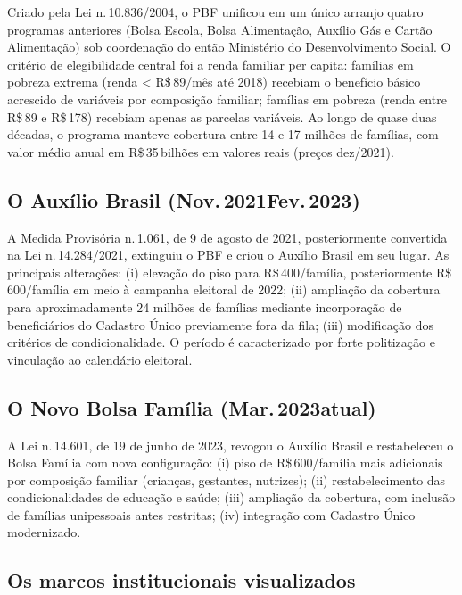 \documentclass[12pt,a4paper,oneside]{article}
\newcommand{\rs}{R\$\,}
\begin{document}
Criado pela Lei n.\,10.836/2004, o PBF unificou em um único arranjo
quatro programas anteriores (Bolsa Escola, Bolsa Alimentação,
Auxílio Gás e Cartão Alimentação) sob coordenação do então
Ministério do Desenvolvimento Social. O critério de elegibilidade
central foi a renda familiar per capita: famílias em pobreza
extrema (renda < \rs 89/mês até 2018) recebiam o benefício básico
acrescido de variáveis por composição familiar; famílias em pobreza
(renda entre \rs 89 e \rs 178) recebiam apenas as parcelas
variáveis. Ao longo de quase duas décadas, o programa manteve
cobertura entre 14 e 17 milhões de famílias, com valor médio anual
em \rs 35\,bilhões em valores reais (preços
dez/2021).

\subsection{O Auxílio Brasil (Nov.\,2021\textendash Fev.\,2023)}

A Medida Provisória n.\,1.061, de 9 de agosto de 2021,
posteriormente convertida na Lei n.\,14.284/2021, extinguiu o PBF e
criou o Auxílio Brasil em seu lugar. As principais alterações:
(i) elevação do piso para \rs 400/família, posteriormente
\rs 600/família em meio à campanha eleitoral de 2022;
(ii) ampliação da cobertura para aproximadamente 24 milhões de
famílias mediante incorporação de beneficiários do Cadastro Único
previamente fora da fila; (iii) modificação dos critérios de
condicionalidade. O período é caracterizado por forte politização e
vinculação ao calendário eleitoral.

\subsection{O Novo Bolsa Família (Mar.\,2023\textendash atual)}

A Lei n.\,14.601, de 19 de junho de 2023, revogou o Auxílio Brasil e
restabeleceu o Bolsa Família com nova configuração: (i) piso de
\rs 600/família mais adicionais por composição familiar (crianças,
gestantes, nutrizes); (ii) restabelecimento das condicionalidades
de educação e saúde; (iii) ampliação da cobertura, com inclusão de
famílias unipessoais antes restritas; (iv) integração com
Cadastro Único modernizado.

\subsection{Os marcos institucionais visualizados}
\end{document}

